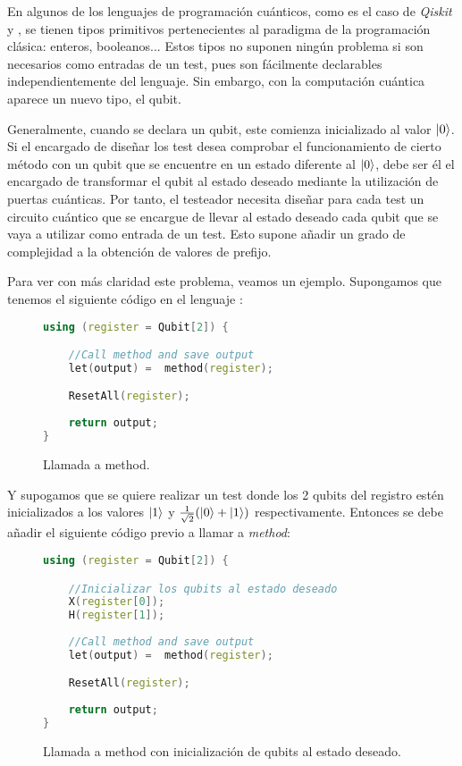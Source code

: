 En algunos de los lenguajes de programación cuánticos, como es el caso de \textit{Qiskit} y \qsh, se tienen tipos primitivos pertenecientes al paradigma de la programación clásica: enteros, booleanos... Estos tipos no suponen ningún problema si son necesarios como entradas de un test, pues son fácilmente declarables independientemente del lenguaje. Sin embargo, con la computación cuántica aparece un nuevo tipo, el qubit. 

Generalmente, cuando se declara un qubit, este comienza inicializado al valor $\left|0\right\rangle$. Si el encargado de diseñar los test desea comprobar el funcionamiento de cierto método con un qubit que se encuentre en un estado diferente al $\left|0\right\rangle$, debe ser él el encargado de transformar el qubit al estado deseado mediante la utilización de puertas cuánticas. Por tanto, el testeador necesita diseñar para cada test un circuito cuántico que se encargue de llevar al estado deseado cada qubit que se vaya a utilizar como entrada de un test. Esto supone añadir un grado de complejidad a la obtención de valores de prefijo.

Para ver con más claridad este problema, veamos un ejemplo. Supongamos que tenemos el siguiente código en el lenguaje \qsh:

\begin{figure}[htb]
\begin{lstlisting}[language=c++]
using (register = Qubit[2]) {

	//Call method and save output
	let(output) =  method(register);

	ResetAll(register);
	
	return output;
}
\end{lstlisting}
\caption{Llamada a method.}
\label{fig:code4}
\end{figure}

Y supogamos que se quiere realizar un test donde los 2 qubits del registro estén inicializados a los valores $\left|1\right\rangle$ y $\tfrac{1}{\sqrt{2}}(\left|0\right\rangle+\left|1\right\rangle)$ respectivamente. Entonces se 
debe añadir el siguiente código previo a llamar a \textit{method}:\clearpage

\begin{figure}[htb]
\begin{lstlisting}[language=c++]
using (register = Qubit[2]) {

	//Inicializar los qubits al estado deseado
	X(register[0]);
	H(register[1]);
	
	//Call method and save output
	let(output) =  method(register);

	ResetAll(register);
	
	return output;
}
\end{lstlisting}
\caption{Llamada a method con inicialización de qubits al estado deseado.}
\label{fig:code4}
\end{figure}

